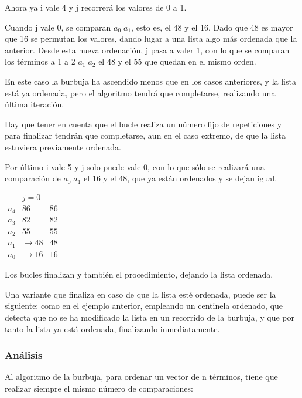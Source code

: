 \documentclass[8pt, A4]{article}    %
\begin{document}
Ahora ya i vale 4 y j recorrerá los valores de 0 a 1.

Cuando j vale 0, se comparan ${\displaystyle a_{0}\;a_{1}}$, esto es, el 48 y el 16. Dado que 48 es mayor que 16 se permutan los valores, dando lugar a una lista algo más ordenada que la anterior. Desde esta nueva ordenación, j pasa a valer 1, con lo que se comparan los términos a 1 a 2 ${\displaystyle a_{1}\;a_{2}}$ el 48 y el 55 que quedan en el mismo orden.

En este caso la burbuja ha ascendido menos que en los casos anteriores, y la lista está ya ordenada, pero el algoritmo tendrá que completarse, realizando una última iteración.

Hay que tener en cuenta que el bucle realiza un número fijo de repeticiones y para finalizar tendrán que completarse, aun en el caso extremo, de que la lista estuviera previamente ordenada.

Por último i vale 5 y j solo puede vale 0, con lo que sólo se realizará una comparación de ${\displaystyle a_{0}\;a_{1}}$ el 16 y el 48, que ya están ordenados y se dejan igual.

\begin{table}[h]
\centering
 $\begin{array}{r||r|r}
            & j =  0 &     \\
      \hline
      a_{4} &     86 & 86 \\
      a_{3} &     82 & 82 \\
      a_{2} &     55 & 55 \\
      a_{1} & \to 48 & 48 \\
      a_{0} & \to 16 & 16
   \end{array}$
\end{table}

Los bucles finalizan y también el procedimiento, dejando la lista ordenada.

Una variante que finaliza en caso de que la lista esté ordenada, puede ser la siguiente: como en el ejemplo anterior, empleando un centinela ordenado, que detecta que no se ha modificado la lista en un recorrido de la burbuja, y que por tanto la lista ya está ordenada, finalizando inmediatamente.


\subsubsection{Análisis}
Al algoritmo de la burbuja, para ordenar un vector de n términos, tiene que realizar siempre el mismo número de comparaciones:
\end{document}
